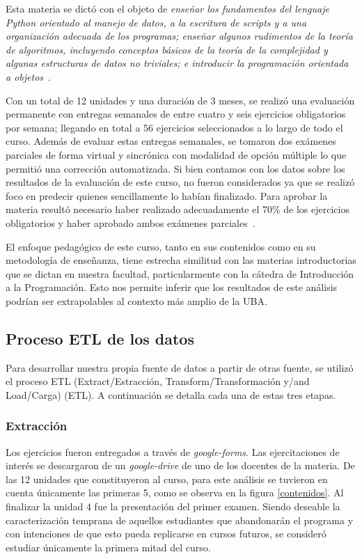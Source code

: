 \documentclass[11pt,a4paper,twoside,openany]{tesis}
\begin{document}
Esta materia se dictó con el objeto de \emph{enseñar los fundamentos del lenguaje Python orientado al manejo de datos, a la escritura de \emph{scripts} y a una organización adecuada de los programas; enseñar  algunos  rudimentos  de  la  teoría  de  algoritmos,  incluyendo  conceptos  básicos  de  la teoría de la complejidad y algunas estructuras de datos no triviales; e introducir la programación orientada a objetos}~\cite{unsam2020}.

Con un total de 12 unidades y una duración de 3 meses, se realizó una evaluación permanente con entregas semanales de entre cuatro y seis ejercicios obligatorios por semana; llegando en total a  56  ejercicios  seleccionados  a  lo  largo  de  todo  el  curso.  Además  de  evaluar  estas  entregas semanales, se tomaron dos exámenes parciales de forma virtual y sincrónica con modalidad de opción múltiple lo que permitió una corrección automatizada. Si bien contamos con los datos sobre los resultados de la evaluación de este curso, no fueron considerados ya que se realizó foco en predecir quienes sencillamente lo habían finalizado. Para aprobar la materia resultó necesario haber realizado adecuadamente el 70\% de los  ejercicios  obligatorios  y  haber  aprobado  ambos  exámenes  parciales~\cite{unsam2020}.

El enfoque pedagógico de este curso, tanto en sus contenidos como en su metodología de enseñanza, tiene estrecha similitud con las materias introductorias que se dictan en nuestra facultad, particularmente con la cátedra de Introducción a la Programación. Esto nos permite inferir que los resultados de este análisis podrían ser extrapolables al contexto más amplio de la UBA.


\subsection{Proceso ETL de los datos}

Para desarrollar nuestra propia fuente de datos a partir de otras fuente, se utilizó el proceso ETL (Extract/Estracción, Transform/Transformación y/and Load/Carga) (ETL). A continuación se detalla cada una de estas tres etapas.

\subsubsection{Extracción}\textbf{ }

Los ejercicios fueron entregados a través de \emph{google-forms}. Las ejercitaciones de interés se descargaron de un \emph{google-drive} de uno de los docentes de la materia. De las 12 unidades que constituyeron al curso, para este análisis se tuvieron en cuenta únicamente las primeras 5, como se observa en la figura \ref{contenidos}. Al finalizar la unidad 4 fue la presentación del primer examen. Siendo deseable la caracterización temprana de aquellos estudiantes que abandonarán el programa y con intenciones de que esto pueda replicarse en cursos futuros, se consideró estudiar únicamente la primera mitad del curso. 
\end{document}
